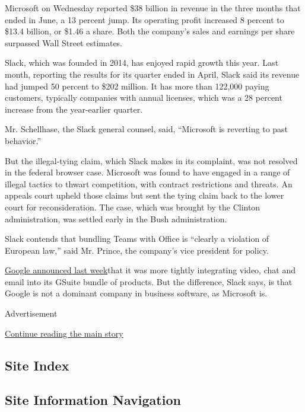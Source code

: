 Microsoft on Wednesday reported \$38 billion in revenue in the three
months that ended in June, a 13 percent jump. Its operating profit
increased 8 percent to \$13.4 billion, or \$1.46 a share. Both the
company's sales and earnings per share surpassed Wall Street estimates.

Slack, which was founded in 2014, has enjoyed rapid growth this year.
Last month, reporting the results for its quarter ended in April, Slack
said its revenue had jumped 50 percent to \$202 million. It has more
than 122,000 paying customers, typically companies with annual licenses,
which was a 28 percent increase from the year-earlier quarter.

Mr. Schellhase, the Slack general counsel, said, ``Microsoft is
reverting to past behavior.''

But the illegal-tying claim, which Slack makes in its complaint, was not
resolved in the federal browser case. Microsoft was found to have
engaged in a range of illegal tactics to thwart competition, with
contract restrictions and threats. An appeals court upheld those claims
but sent the tying claim back to the lower court for reconsideration.
The case, which was brought by the Clinton administration, was settled
early in the Bush administration.

Slack contends that bundling Teams with Office is ``clearly a violation
of European law,'' said Mr. Prince, the company's vice president for
policy.

\href{https://cloud.google.com/blog/products/g-suite/introducing-your-new-home-for-work-in-gsuite}{Google
announced last week}that it was more tightly integrating video, chat and
email into its GSuite bundle of products. But the difference, Slack
says, is that Google is not a dominant company in business software, as
Microsoft is.

Advertisement

\protect\hyperlink{after-bottom}{Continue reading the main story}

\hypertarget{site-index}{%
\subsection{Site Index}\label{site-index}}

\hypertarget{site-information-navigation}{%
\subsection{Site Information
Navigation}\label{site-information-navigation}}

